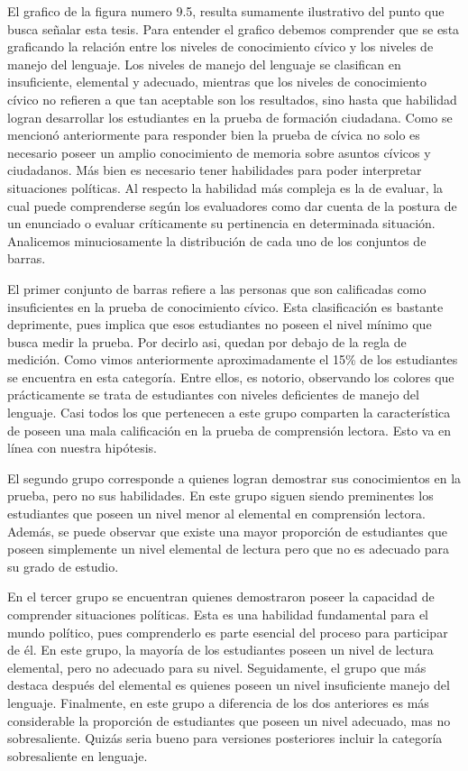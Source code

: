 \documentclass[12pt,twoside]{templates/facsothesis}
\begin{document}
El grafico de la figura numero 9.5, resulta sumamente ilustrativo del punto que busca señalar esta tesis. Para entender el grafico debemos comprender que se esta graficando la relación entre los niveles de conocimiento cívico y los niveles de manejo del lenguaje. Los niveles de manejo del lenguaje se clasifican en insuficiente, elemental y adecuado, mientras que los niveles de conocimiento cívico no refieren a que tan aceptable son los resultados, sino hasta que habilidad logran desarrollar los estudiantes en la prueba de formación ciudadana. Como se mencionó anteriormente para responder bien la prueba de cívica no solo es necesario poseer un amplio conocimiento de memoria sobre asuntos cívicos y ciudadanos. Más bien es necesario tener habilidades para poder interpretar situaciones políticas. Al respecto la habilidad más compleja es la de evaluar, la cual puede comprenderse según los evaluadores como dar cuenta de la postura de un enunciado o evaluar críticamente su pertinencia en determinada situación. Analicemos minuciosamente la distribución de cada uno de los conjuntos de barras.

El primer conjunto de barras refiere a las personas que son calificadas como insuficientes en la prueba de conocimiento cívico. Esta clasificación es bastante deprimente, pues implica que esos estudiantes no poseen el nivel mínimo que busca medir la prueba. Por decirlo asi, quedan por debajo de la regla de medición. Como vimos anteriormente aproximadamente el 15\% de los estudiantes se encuentra en esta categoría. Entre ellos, es notorio, observando los colores que prácticamente se trata de estudiantes con niveles deficientes de manejo del lenguaje. Casi todos los que pertenecen a este grupo comparten la característica de poseen una mala calificación en la prueba de comprensión lectora. Esto va en línea con nuestra hipótesis.

El segundo grupo corresponde a quienes logran demostrar sus conocimientos en la prueba, pero no sus habilidades. En este grupo siguen siendo preminentes los estudiantes que poseen un nivel menor al elemental en comprensión lectora. Además, se puede observar que existe una mayor proporción de estudiantes que poseen simplemente un nivel elemental de lectura pero que no es adecuado para su grado de estudio.

En el tercer grupo se encuentran quienes demostraron poseer la capacidad de comprender situaciones políticas. Esta es una habilidad fundamental para el mundo político, pues comprenderlo es parte esencial del proceso para participar de él. En este grupo, la mayoría de los estudiantes poseen un nivel de lectura elemental, pero no adecuado para su nivel. Seguidamente, el grupo que más destaca después del elemental es quienes poseen un nivel insuficiente manejo del lenguaje. Finalmente, en este grupo a diferencia de los dos anteriores es más considerable la proporción de estudiantes que poseen un nivel adecuado, mas no sobresaliente. Quizás seria bueno para versiones posteriores incluir la categoría sobresaliente en lenguaje.
\end{document}
